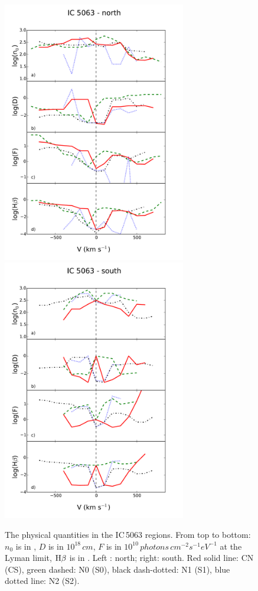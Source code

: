 \documentclass[../main.tex]{subfiles}
\begin{document}
\begin{figure}
\includegraphics[width=8.0cm]{PhD_thesis/images/paper1/icn.pdf}
\includegraphics[width=8.0cm]{PhD_thesis/images/paper1/ics.pdf}
\caption{The physical quantities in the IC\,5063 regions. From top to bottom: $n_0$ is in , $D$ is in $10^{18}\,\si{cm}$, $F$ is in $10^{10}\,\si{photons\,cm^{-2} s^{-1} eV^{-1}}$ at the Lyman limit, $\rm H\beta$ is in \erg. Left : north; right: south. Red solid line: CN (CS), green dashed: N0 (S0), black dash-dotted: N1 (S1), blue dotted line: N2 (S2).}
\label{fig:IC_m}
\end{figure}
\end{document}
